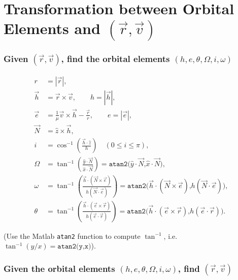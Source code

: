 \documentclass[10pt]{article}
\date{}
\newcommand{\parenth}[1]{\ensuremath{\left( #1 \right)}}
\theoremstyle{plain}\theorembodyfont{\normalfont}
\begin{document}
\pagestyle{empty}
\section*{Transformation between Orbital Elements and $(\vec r, \vec v)$}

\subsubsection*{Given $(\vec r, \vec v)$, find the orbital elements $(h,e,\theta,\Omega,i,\omega)$}

\begin{align*}
r & = |\vec r|,\\ 
\vec h & = \vec r \times \vec v,\qquad h = |\vec h|,\\
\vec e & = \frac{1}{\mu} \vec v \times \vec h - \frac{\vec r}{r},\qquad e = | \vec e|,\\
\vec N & = \hat z \times \vec h,\\
i & = \cos^{-1} \parenth{\frac{\vec h\cdot \hat z}{h}}\quad (0\leq i \leq \pi),\\
\Omega & = \tan^{-1} \parenth{\frac{\hat y \cdot \vec N}{\hat x \cdot \vec N}}
=\texttt{atan2(}{{\hat y \cdot \vec N}\texttt{,}{\hat x \cdot \vec N}}\texttt{)},\\
\omega & = \tan^{-1} \parenth{\frac{\vec h \cdot (\vec N \times \vec e)}{h (\vec N \cdot \vec e)}}
=\texttt{atan2(}{{\vec h \cdot (\vec N \times \vec e)}\texttt{,}{h (\vec N \cdot \vec e)}}\texttt{)},\\
\theta & = \tan^{-1} \parenth{\frac{\vec h \cdot (\vec e \times \vec r)}{h (\vec e \cdot \vec r)}}=\texttt{atan2(}{{\vec h \cdot (\vec e \times \vec r)}\texttt{,}{h (\vec e \cdot \vec r)}}\texttt{)}.
\end{align*}

\noindent (Use the Matlab \texttt{atan2} function to compute $\tan^{-1}$, i.e. $\tan^{-1}(y/x) =\texttt{atan2(y,x)}$).\\


\subsubsection*{Given the orbital elements $(h,e,\theta,\Omega,i,\omega)$, find $(\vec r, \vec v)$}
\end{document}
